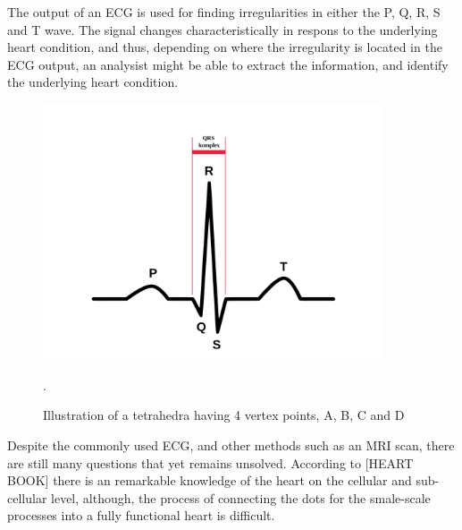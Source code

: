 The output of an ECG is used for finding irregularities in either the P, Q, R, S and T wave. The signal changes characteristically in respons to the underlying heart condition, and thus, depending on where the irregularity is located in the ECG output, an analysist might be able to extract the information, and identify the underlying heart condition.
\begin{figure}[h]
 \centering 
     \includegraphics[width=0.9\textwidth]{bilder/b_ecg_pqrst}
     \caption{Illustration of a tetrahedra having 4 vertex points, A, B, C and D}.
     \label{b_ecg_pqrst.png}
\end{figure}

Despite the commonly used ECG, and other methods such as an MRI scan, there are still many questions that yet remains unsolved. According to [HEART BOOK] there is an remarkable knowledge of the heart on the cellular and sub-cellular level, although, the process of connecting the dots for the smale-scale processes into a fully functional heart is difficult.














